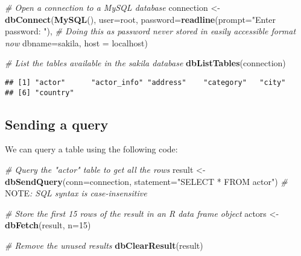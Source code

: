 \documentclass[
]{article}
\newenvironment{Shaded}{\begin{snugshade}}{\end{snugshade}}
\newcommand{\AlertTok}[1]{\textcolor[rgb]{0.94,0.16,0.16}{#1}}
\newcommand{\CommentTok}[1]{\textcolor[rgb]{0.56,0.35,0.01}{\textit{#1}}}
\newcommand{\DataTypeTok}[1]{\textcolor[rgb]{0.13,0.29,0.53}{#1}}
\newcommand{\DecValTok}[1]{\textcolor[rgb]{0.00,0.00,0.81}{#1}}
\newcommand{\KeywordTok}[1]{\textcolor[rgb]{0.13,0.29,0.53}{\textbf{#1}}}
\newcommand{\NormalTok}[1]{#1}
\newcommand{\StringTok}[1]{\textcolor[rgb]{0.31,0.60,0.02}{#1}}
\begin{document}
\begin{Shaded}
\begin{Highlighting}[]
\CommentTok{\# Open a connection to a MySQL database}
\NormalTok{connection \textless{}{-}}\StringTok{ }\KeywordTok{dbConnect}\NormalTok{(}\KeywordTok{MySQL}\NormalTok{(), }
                            \DataTypeTok{user=}\StringTok{\textquotesingle{}root\textquotesingle{}}\NormalTok{, }
                            \DataTypeTok{password=}\KeywordTok{readline}\NormalTok{(}\DataTypeTok{prompt=}\StringTok{"Enter password: "}\NormalTok{), }\CommentTok{\# Doing this as password never stored in easily accessible format now}
                            \DataTypeTok{dbname=}\StringTok{\textquotesingle{}sakila\textquotesingle{}}\NormalTok{,}
                            \DataTypeTok{host =} \StringTok{\textquotesingle{}localhost\textquotesingle{}}\NormalTok{)}

\CommentTok{\# List the tables available in the sakila database}
\KeywordTok{dbListTables}\NormalTok{(connection)}
\end{Highlighting}
\end{Shaded}

\begin{verbatim}
## [1] "actor"      "actor_info" "address"    "category"   "city"      
## [6] "country"
\end{verbatim}

\hypertarget{sending-a-query}{%
\subsection{Sending a query}\label{sending-a-query}}

We can query a table using the following code:

\begin{Shaded}
\begin{Highlighting}[]
\CommentTok{\# Query the "actor" table to get all the rows}
\NormalTok{result \textless{}{-}}\StringTok{ }\KeywordTok{dbSendQuery}\NormalTok{(}\DataTypeTok{conn=}\NormalTok{connection, }\DataTypeTok{statement=}\StringTok{"SELECT * FROM actor"}\NormalTok{) }\CommentTok{\# }\AlertTok{NOTE}\CommentTok{: SQL syntax is case{-}insensitive}

\CommentTok{\# Store the first 15 rows of the result in an R data frame object}
\NormalTok{actors \textless{}{-}}\StringTok{ }\KeywordTok{dbFetch}\NormalTok{(result, }\DataTypeTok{n=}\DecValTok{15}\NormalTok{)}

\CommentTok{\# Remove the unused results}
\KeywordTok{dbClearResult}\NormalTok{(result)}
\end{Highlighting}
\end{Shaded}
\end{document}
